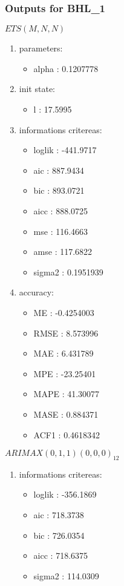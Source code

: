 \documentclass[10pt,a4paper]{article}\usepackage[]{graphicx}\usepackage[]{color}
\newcommand{\AaA}{\_}
\begin{document}
\subsubsection{Outputs for BHL\AaA 1}
\begin{multicols}{2}


$ ETS(M,N,N) $
\begin{enumerate}
\item parameters:
\begin{itemize}
\item  alpha :  0.1207778 
\end{itemize}
\item init state:
\begin{itemize}
\item  l :  17.5995 
\end{itemize}
\item informations critereas:
\begin{itemize}
\item  loglik :  -441.9717 
\item  aic :  887.9434 
\item  bic :  893.0721 
\item  aicc :  888.0725 
\item  mse :  116.4663 
\item  amse :  117.6822 
\item  sigma2 :  0.1951939 
\end{itemize}
\item accuracy:
\begin{itemize}
\item  ME :  -0.4254003 
\item  RMSE :  8.573996 
\item  MAE :  6.431789 
\item  MPE :  -23.25401 
\item  MAPE :  41.30077 
\item  MASE :  0.884371 
\item  ACF1 :  0.4618342 
\end{itemize}
\end{enumerate}

\columnbreak


 $ARIMAX(0,1,1)(0,0,0)_{12}$ 
\begin{enumerate}
\item informations critereas:
\begin{itemize}
\item  loglik :  -356.1869 
\item  aic :  718.3738 
\item  bic :  726.0354 
\item  aicc :  718.6375 
\item  sigma2 :  114.0309 
\end{itemize}


\end{enumerate}
\end{multicols}
\end{document}
